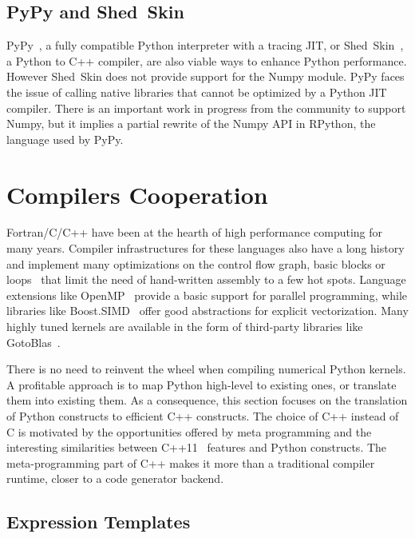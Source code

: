 \documentclass[10pt, preprint]{sigplanconf}
\begin{document}
\subsection{PyPy and Shed~Skin}

PyPy~\cite{pypy2009}, a fully compatible Python interpreter with a tracing JIT,
or Shed~Skin~\cite{shedskin2006}, a Python to C++ compiler, are also viable
ways to enhance Python performance. However Shed~Skin does not provide support
for the Numpy module. PyPy faces the issue of calling native libraries that
cannot be optimized by a Python JIT compiler. There is an important work in
progress from the community to support Numpy, but it implies a partial rewrite
of the Numpy API in RPython, the language used by PyPy.



\section{Compilers Cooperation}
\label{sec:pythran}

Fortran/C/C++ have been at the hearth of high performance computing for many years.
Compiler infrastructures for these languages also have a long history and
implement many optimizations on the control flow graph, basic blocks or
loops~\cite{Aho2006} that limit the need of hand-written assembly to a few hot
spots.
Language extensions like OpenMP~\cite{openmp4} provide a basic support for
parallel programming, while libraries like Boost.SIMD~\cite{esterie2012boost}
offer good abstractions for explicit vectorization. Many highly tuned kernels
are available in the form of third-party libraries like
GotoBlas~\cite{gotoblas2008}.

There is no need to reinvent the wheel when compiling numerical Python kernels.
A profitable approach is to map Python high-level to existing ones, or
translate them into existing them.
As a consequence, this section focuses on the translation of Python constructs
to efficient C++ constructs. The choice of
C++ instead of C is motivated by the opportunities offered by meta programming
and the interesting similarities between C++11~\cite{isocxx11} features and
Python constructs.
The meta-programming part of C++ makes it more than a traditional compiler
runtime, closer to a code generator backend.

\subsection{Expression Templates}
\label{sec:expression-templates}
\end{document}

